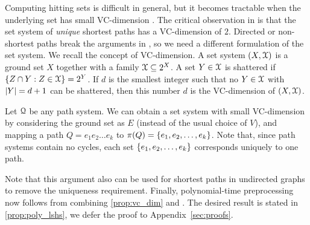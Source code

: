 Computing hitting sets is difficult in general, but it becomes tractable when the underlying set has small VC-dimension \cite{vc_dim_hitting}.
The critical observation in \cite{highway2013} is that the set system of \emph{unique} shortest paths has a VC-dimension of $2$.
Directed or non-shortest paths break the arguments in \cite{highway2013}, so we need a different formulation of the set system.
We recall the concept of VC-dimension.
A set system $(X,\mathcal{X})$ is a ground set $X$ together with a family $\mathcal{X}\subseteq 2^X$.
A set $Y\in \mathcal{X}$ is shattered if $\{Z\cap Y:Z\in\mathcal{X}\}=2^Y$.
If $d$ is the smallest integer such that no $Y\in\mathcal{X}$ with $\lvert Y\rvert=d+1$ can be shattered, then this number $d$ is the VC-dimension of $(X,\mathcal{X})$.

Let $\mathcal{Q}$ be any path system.
We can obtain a set system with small VC-dimension by considering the ground set as $E$ (instead of the usual choice of $V$), and mapping a path $Q=e_1e_2\ldots e_k$ to $\pi(Q)=\{e_1,e_2,\ldots,e_k\}$.
Note that, since path systems contain no cycles, each set $\{e_1,e_2,\ldots,e_k\}$ corresponds uniquely to one path.
Note that this argument also can be used for shortest paths in undirected graphs to remove the uniqueness requirement.
Finally, polynomial-time preprocessing now follows from combining \cref{prop:vc_dim} and \cite{vc_dim_hitting}.
The desired result is stated in \cref{prop:poly_lshs}, we defer the proof to Appendix~\ref{sec:proofs}.

